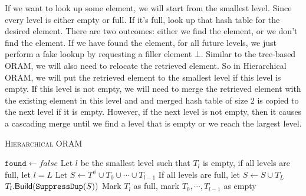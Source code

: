 If we want to look up some element, we will start from the smallest level.
Since every level is either empty or full. If it's full, 
look up that hash table for the desired element.
There are two outcomes: either we find the element, or we don't find the element.
If we have found the element, for all future levels, we just 
perform a fake lookup by requesting a filler element $\bot$.
Similar to the tree-based ORAM, 
we will also need to relocate the retrieved element.
So in Hierarchical ORAM, we will put the retrieved element 
to the smallest level if this level is empty.
If this level is not empty, we will need to merge the retrieved element with the existing element in this level and 
and merged hash table of size $2$ is copied to the next level
if it is empty. 
However, if the next level is not empty, then 
it causes a cascading merge until we find a level that is empty
or we reach the largest level.  

\begin{algorithm}[t]
  \caption{\textsc{Hierarchical ORAM}}
  \label{alg:oram}
 
 $\texttt{found} \leftarrow false$\;
 Let $l$ be the smallest level such that $T_l$ is empty, if all levels are full, let $l = L$\;
 Let $S \leftarrow T^\phi \cup T_0 \cup \cdots \cup T_{l-1}$\;
 If all levels are full, let $S \leftarrow S \cup T_L$\;
 $T_l.{\sf Build}(\texttt{SuppressDup}(S))$\;
 Mark $T_l$ as full, mark $T_0, \cdots, T_{l-1}$ as empty\;
 \end{algorithm}



